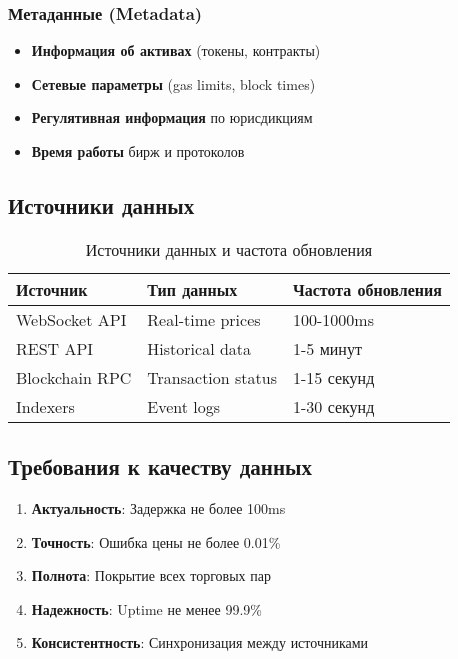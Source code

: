 \documentclass[a4paper,11pt]{article}
\begin{document}
\subsubsection{Метаданные (Metadata)}
\begin{itemize}
    \item \textbf{Информация об активах} (токены, контракты)
    \item \textbf{Сетевые параметры} (gas limits, block times)
    \item \textbf{Регулятивная информация} по юрисдикциям
    \item \textbf{Время работы} бирж и протоколов
\end{itemize}

\subsection{Источники данных}

\begin{table}[H]
\centering
\begin{tabular}{|l|l|l|}
\hline
\textbf{Источник} & \textbf{Тип данных} & \textbf{Частота обновления} \\
\hline
WebSocket API & Real-time prices & 100-1000ms \\
REST API & Historical data & 1-5 минут \\
Blockchain RPC & Transaction status & 1-15 секунд \\
Indexers & Event logs & 1-30 секунд \\
\hline
\end{tabular}
\caption{Источники данных и частота обновления}
\end{table}

\subsection{Требования к качеству данных}

\begin{enumerate}
    \item \textbf{Актуальность}: Задержка не более 100ms
    \item \textbf{Точность}: Ошибка цены не более 0.01\%
    \item \textbf{Полнота}: Покрытие всех торговых пар
    \item \textbf{Надежность}: Uptime не менее 99.9\%
    \item \textbf{Консистентность}: Синхронизация между источниками
\end{enumerate}
\end{document}
